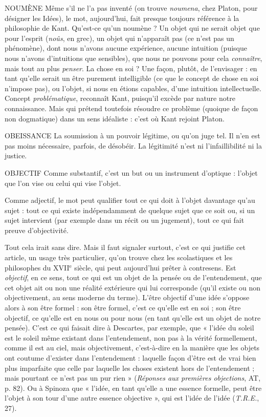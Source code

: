 NOUMÈNE Même s’il ne l'a pas inventé (on trouve {\it noumena}, chez Platon,
pour désigner les Idées), le mot, aujourd’hui, fait presque toujours
référence à la philosophie de Kant. Qu'est-ce qu’un noumène ? Un objet
qui ne serait objet que pour l'esprit ({\it noûs}, en grec), un objet qui n'apparaît pas
(ce n’est pas un phénomène), dont nous n’avons aucune expérience, aucune
intuition (puisque nous n’avons d’intuitions que sensibles), que nous ne pouvons
pour cela {\it connaître}, mais tout au plus {\it penser}. La chose en soi ? Une façon,
plutôt, de l’envisager : en tant qu’elle serait un être purement intelligible (ce
que le concept de chose en soi n’impose pas), ou l'objet, si nous en étions
capables, d’une intuition intellectuelle. Concept {\it problématique}, reconnaît
Kant, puisqu'il excède par nature notre connaissance. Mais qui prétend toutefois
résoudre ce problème (quoique de façon non dogmatique) dans un sens
idéaliste : c’est où Kant rejoint Platon.

OBEISSANCE La soumission à un pouvoir légitime, ou qu’on juge tel. Il
n’en est pas moins nécessaire, parfois, de désobéir. La légitimité
n’est ni l’infaillibilité ni la justice.

OBJECTIF Comme substantif, c’est un but ou un instrument d'optique :
l’objet que l’on vise ou celui qui vise l’objet.

Comme adjectif, le mot peut qualifier tout ce qui doit à l’objet davantage
qu'au sujet : tout ce qui existe indépendamment de quelque sujet que ce soit
ou, si un sujet intervient (par exemple dans un récit ou un jugement), tout ce
qui fait preuve d’objectivité.

Tout cela irait sans dire. Mais il faut signaler surtout, c’est ce qui justifie cet
article, un usage très particulier, qu’on trouve chez les scolastiques et les philosophes
du {\footnotesize XVII$^\text{e}$} siècle, qui peut aujourd’hui prêter à contresens. Est {\it objectif}, en
ce sens, tout ce qui est un objet de la pensée ou de l’entendement, que cet objet
ait ou non une réalité extérieure qui lui corresponde (qu’il existe ou non objectivement,
au sens moderne du terme). L’être objectif d’une idée s’oppose alors
à son être formel : son être formel, c’est ce qu’elle est en soi ; son être objectif,
ce qu’elle est en nous ou pour nous (en tant qu’elle est un objet de notre
pensée). C’est ce qui faisait dire à Descartes, par exemple, que « l’idée du soleil
est le soleil même existant dans l’entendement, non pas à la vérité formellement,
comme il est au ciel, mais objectivement, c’est-à-dire en la manière que
les objets ont coutume d’exister dans l’entendement : laquelle façon d’être est
de vrai bien plus imparfaite que celle par laquelle les choses existent hors de
l’entendement ; mais pourtant ce n’est pas un pur rien » ({\it Réponses aux premières
objections}, AT, p. 82). Ou à Spinoza que « l’idée, en tant qu’elle a une essence
formelle, peut être l’objet à son tour d’une autre essence objective », qui est
l'idée de l’idée ({\it T.R.E.}, 27).

